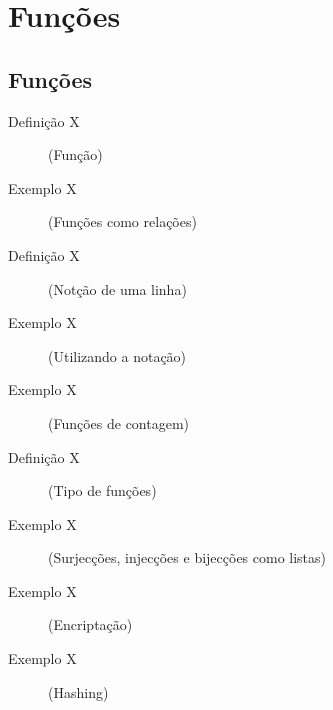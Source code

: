 \chapter{Funções}%

\section{Funções}

\begin{description}
	\item[Definição X] (Função)
\end{description}

\begin{description}
	\item[Exemplo X] (Funções como relações)
\end{description}

\begin{description}
	\item[Definição X] (Notção de uma linha)
\end{description}


\begin{description}
	\item[Exemplo X] (Utilizando a notação)
\end{description}

\begin{description}
	\item[Exemplo X] (Funções de contagem)
\end{description}

\begin{description}
	\item[Definição X] (Tipo de funções)
\end{description}

\begin{description}
	\item[Exemplo X] (Surjecções, injecções e bijecções como listas)
\end{description}

\begin{description}
	\item[Exemplo X] (Encriptação)
\end{description}

\begin{description}
	\item[Exemplo X] (Hashing)
\end{description}

